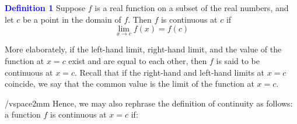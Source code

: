 \documentclass[a4paper, 12pt]{article}
\begin{document}
\vspace{2cm}

    \textbf{\textcolor{blue}{Definition 1}} Suppose \( f \) is a real function on a subset of the real numbers, and let \( c \) be a point in the domain of \( f \). Then \( f \) is continuous at \( c \) if
    \[
    \lim_{x \to c} f(x) = f(c)
    \]

More elaborately, if the left-hand limit, right-hand limit, and the value of the function at \( x = c \) exist and are equal to each other, then \( f \) is said to be continuous at \( x = c \). Recall that if the right-hand and left-hand limits at \( x = c \) coincide, we say that the common value is the limit of the function at \( x = c \). 

/vspace{2mm}
Hence, we may also rephrase the definition of continuity as follows: a function \( f \) is continuous at \( x = c \) if:
\end{document}
